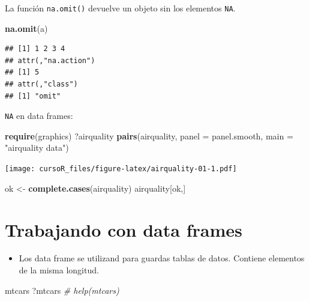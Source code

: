 \documentclass[]{book}
\newenvironment{Shaded}{\begin{snugshade}}{\end{snugshade}}
\newcommand{\KeywordTok}[1]{\textcolor[rgb]{0.13,0.29,0.53}{\textbf{#1}}}
\newcommand{\DataTypeTok}[1]{\textcolor[rgb]{0.13,0.29,0.53}{#1}}
\newcommand{\StringTok}[1]{\textcolor[rgb]{0.31,0.60,0.02}{#1}}
\newcommand{\CommentTok}[1]{\textcolor[rgb]{0.56,0.35,0.01}{\textit{#1}}}
\newcommand{\NormalTok}[1]{#1}
\providecommand{\tightlist}{%
  \setlength{\itemsep}{0pt}\setlength{\parskip}{0pt}}
\begin{document}
La función \texttt{na.omit()} devuelve un objeto sin los elementos
\texttt{NA}.

\begin{Shaded}
\begin{Highlighting}[]
\KeywordTok{na.omit}\NormalTok{(a) }
\end{Highlighting}
\end{Shaded}

\begin{verbatim}
## [1] 1 2 3 4
## attr(,"na.action")
## [1] 5
## attr(,"class")
## [1] "omit"
\end{verbatim}

\texttt{NA} en data frames:

\begin{Shaded}
\begin{Highlighting}[]
\KeywordTok{require}\NormalTok{(graphics)}
\NormalTok{?airquality}
\KeywordTok{pairs}\NormalTok{(airquality, }\DataTypeTok{panel =}\NormalTok{ panel.smooth, }\DataTypeTok{main =} \StringTok{"airquality data"}\NormalTok{)}
\end{Highlighting}
\end{Shaded}

\texttt{[image: cursoR\_files/figure-latex/airquality-01-1.pdf]}

\begin{Shaded}
\begin{Highlighting}[]
\NormalTok{ok <-}\StringTok{ }\KeywordTok{complete.cases}\NormalTok{(airquality)}
\NormalTok{airquality[ok,]}
\end{Highlighting}
\end{Shaded}

\section{Trabajando con data frames}\label{trabajando-con-data-frames-1}

\begin{itemize}
\tightlist
\item
  Los data frame se utilizand para guardas tablas de datos. Contiene
  elementos de la misma longitud.
\end{itemize}

\begin{Shaded}
\begin{Highlighting}[]
\NormalTok{mtcars}
\NormalTok{?mtcars       }\CommentTok{# help(mtcars)}
\end{Highlighting}
\end{Shaded}
\end{document}
